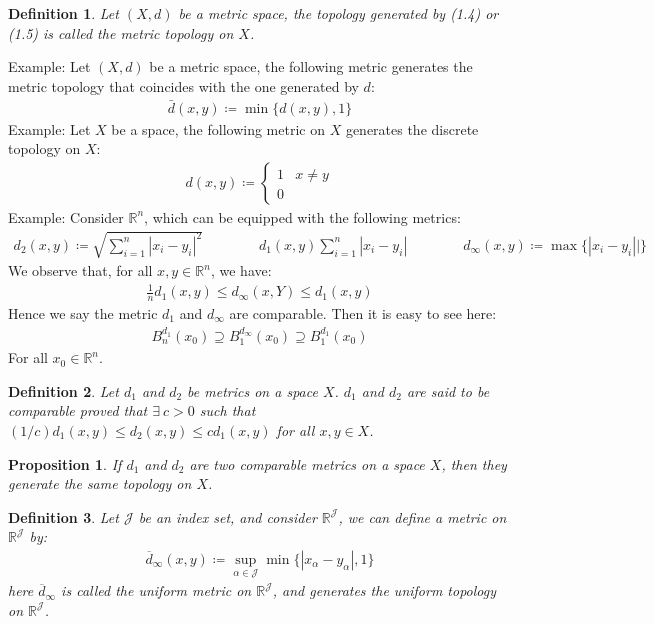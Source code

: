 \documentclass[11pt]{book}
\theoremstyle{break}
\theoremstyle{break}
\newtheorem{prop}[lem]{Proposition}
\newtheorem{defn}{Definition}[corL]
\newcommand{\R}{\mathbb{R}}
\newcommand{\example}{\color{green}Example: \color{black}}
\begin{document}
\begin{defn}
Let $(X,d)$ be a metric space, the topology generated by (1.4) or (1.5) is called the metric topology on $X$. 
\end{defn}
\example Let $(X,d)$ be a metric space, the following metric generates the metric topology that coincides with the one generated by $d$:
\begin{align*}
\bar{d}(x,y) \coloneqq \min \{d(x,y),1\}
\end{align*}
\example Let $X$ be a space, the following metric on $X$ generates the discrete topology on $X$:
\begin{align*}
d(x,y) \coloneqq \begin{cases} 1 & x\neq y \\ 0 \end{cases}
\end{align*}
\example Consider $\R^n$, which can be equipped with the following metrics:
\begin{align*}
d_2(x,y) \coloneqq \sqrt{\sum_{i=1}^n |x_i - y_i|^2} \qquad\qquad d_1(x,y )\sum_{i=1}^n |x_i-y_i|\qquad\qquad
d_\infty (x,y) \coloneqq \max\{ |x_i-y_i||\}
\end{align*}
We observe that, for all $x,y \in \R^n$, we have:
\begin{align*}
\frac{1}{n}d_1(x,y) \leq d_{\infty}(x,Y ) \leq d_1(x,y)
\end{align*}
Hence we say the metric $d_1$ and $d_\infty$ are comparable. Then it is easy to see here:
\begin{align*}
B_n^{d_1}(x_0)\supseteq B_1^{d_\infty} (x_0) \supseteq B_1^{d_1}(x_0)
\end{align*}
For all $x_0 \in \R^n$. 

\begin{defn}
Let $d_1$ and $d_2$ be metrics on a space $X$. $d_1$ and $d_2$ are said to be comparable proved that $\exists\ c>0$ such that $(1/c) d_1(x,y) \leq d_2(x,y) \leq cd_1(x,y)$ for all $x,y \in X$. 
\end{defn}

\begin{prop}
If $d_1$ and $d_2$ are two comparable metrics on a space $X$, then they generate the same topology on $X$.
\end{prop}

\begin{defn}
Let $\mathcal{J}$ be an index set, and consider $\R^\mathcal{J}$, we can define a metric on $\R^{\mathcal{J}}$ by:
\begin{align*}
\overline{d}_\infty (x,y) \coloneqq \sup_{\alpha \in \mathcal{J}}\min\{ |x_\alpha - y_\alpha| , 1\}
\end{align*}
here $\overline{d}_{\infty}$ is called the uniform metric on $\R^{\mathcal{J}}$, and generates the uniform topology on $\R^\mathcal{J}$.
\end{defn}
\end{document}
